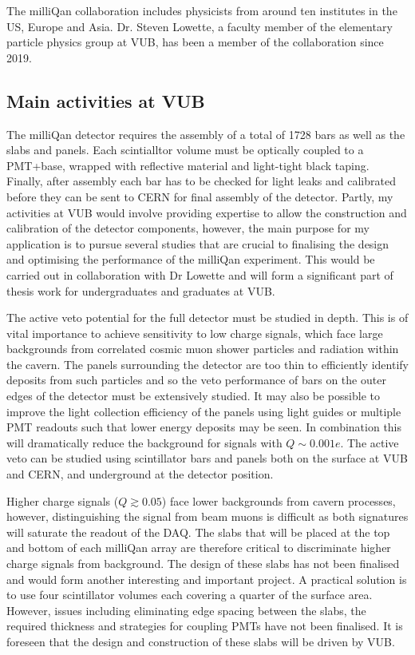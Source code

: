 \documentclass[11pt]{article}
\theoremstyle{plain} \numberwithin{equation}{section}
\theoremstyle{definition}
\begin{document}
The milliQan collaboration includes physicists from around ten institutes in the US, 
Europe and Asia. Dr. Steven Lowette, a faculty member of the elementary particle 
physics group at VUB, has been a member of the collaboration since
2019.  

\subsection*{Main activities at VUB}

The milliQan detector requires the assembly of a total of 1728 bars as well
as the slabs and panels. Each scintialltor volume 
must be optically coupled to a PMT+base, wrapped with reflective
material and light-tight black taping. 
Finally, after assembly each bar has to be checked for light leaks and calibrated 
before they can be sent to CERN for final assembly of the detector.
Partly, my activities at VUB would involve providing expertise to allow 
the construction and calibration of the detector components, 
however, the main purpose for my application is
to pursue several studies that are crucial to finalising the design and optimising the performance 
of the milliQan experiment. This would be carried out in collaboration with Dr Lowette and
will form a significant part of thesis work for undergraduates and graduates at VUB.

The active veto potential for the full detector must be studied in depth.
This is of vital importance to achieve sensitivity to low charge signals, which face large
backgrounds from correlated cosmic muon shower particles and radiation within the cavern. 
The panels surrounding the detector are too thin to efficiently identify deposits from such particles
and so the veto performance of bars on the outer edges of the detector must be extensively 
studied. It may also be possible to improve the light collection efficiency of the panels
using light guides or multiple PMT readouts such that lower energy deposits may be seen. 
In combination this will dramatically reduce the background for signals with $Q \sim 0.001e$.
The active veto can be studied using scintillator bars and panels both on the surface at VUB and
CERN, and underground at the detector position.

Higher charge signals ($Q \gtrsim 0.05$) face lower backgrounds from cavern processes,
however, distinguishing the signal from 
beam muons is difficult as both signatures will saturate the readout of the DAQ. 
The slabs that will be placed at the top and bottom of each milliQan array
are therefore critical to discriminate higher charge signals from background.
The design of these slabs has not been finalised and would form another interesting
and important project. A practical solution is to use four scintillator volumes
each covering a quarter of the surface area. However, issues including eliminating
edge spacing between the slabs, the required thickness and strategies for coupling
PMTs have not been finalised. It is foreseen that the design and construction of
these slabs will be driven by VUB.
\end{document}
